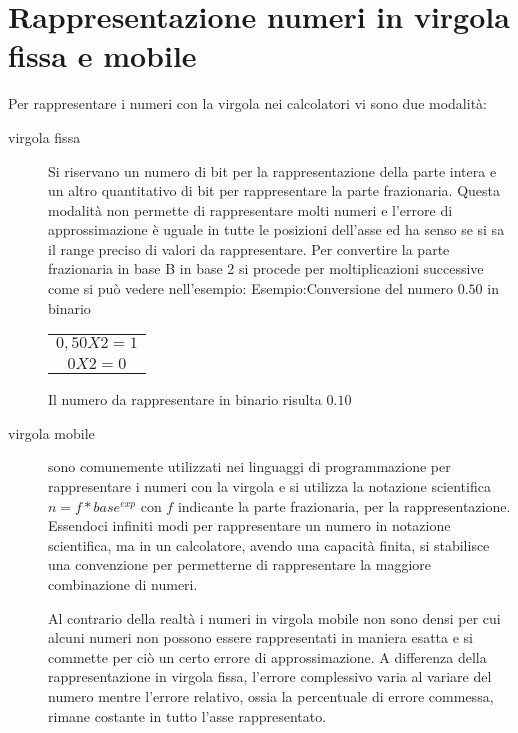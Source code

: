 \section{Rappresentazione numeri in virgola fissa e mobile}
Per rappresentare i numeri con la virgola nei calcolatori vi sono due modalità:
\begin{description}
  \item[virgola fissa] Si riservano un numero di bit per la rappresentazione della
        parte intera e un altro quantitativo di bit per rappresentare la parte frazionaria.\newline
        Questa modalità non permette di rappresentare molti numeri e l'errore di approssimazione
        è uguale in tutte le posizioni dell'asse ed ha senso se si sa il range
        preciso di valori da rappresentare.\newline
        Per convertire la parte frazionaria in base B in base 2 si procede per
        moltiplicazioni successive come si può vedere nell'esempio:
        Esempio:Conversione del numero $0.50$ in binario
        \begin{tabular}{c}
          $0,50 X 2 = 1$\\
          $0 X 2 = 0$\\
        \end{tabular}
        Il numero da rappresentare in binario risulta $0.10$

  \item[virgola mobile] sono comunemente utilizzati nei linguaggi di programmazione
        per rappresentare i numeri con la virgola e si utilizza la notazione scientifica
        $n = f * base^{exp}$ con $f$ indicante la parte frazionaria, per la rappresentazione.\newline
        Essendoci infiniti modi per rappresentare un numero in notazione scientifica,
        ma in un calcolatore, avendo una capacità finita, si stabilisce una convenzione
        per permetterne di rappresentare la maggiore combinazione di numeri.


        Al contrario della realtà i numeri in virgola mobile non sono densi per cui
        alcuni numeri non possono essere rappresentati in maniera esatta e si commette
        per ciò un certo errore di approssimazione.\newline
        A differenza della rappresentazione in virgola fissa, l'errore complessivo varia
        al variare del numero mentre l'errore relativo, ossia la percentuale di errore commessa,
        rimane costante in tutto l'asse rappresentato.


\end{description}
